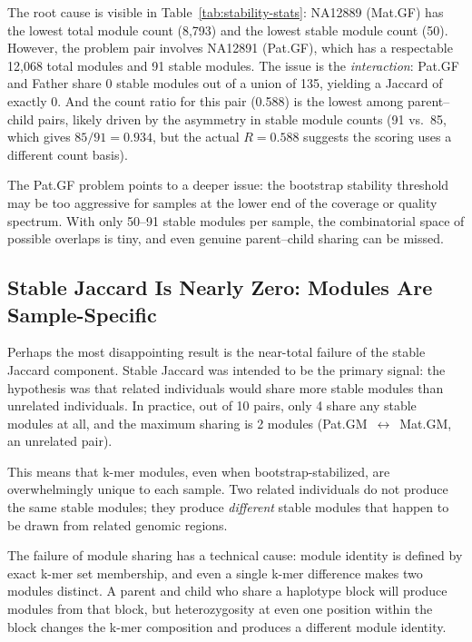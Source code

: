 \documentclass{../yalumba}
\begin{document}

The root cause is visible in Table~\ref{tab:stability-stats}: NA12889 (Mat.GF)
has the lowest total module count (8{,}793) and the lowest stable module count
(50).  However, the problem pair involves NA12891 (Pat.GF), which has a
respectable 12{,}068 total modules and 91 stable modules.  The issue is the
\emph{interaction}: Pat.GF and Father share 0 stable modules out of a union of
135, yielding a Jaccard of exactly 0.  And the count ratio for this pair
(0.588) is the lowest among parent--child pairs, likely driven by the
asymmetry in stable module counts (91 vs.\ 85, which gives $85/91 = 0.934$,
but the actual $R = 0.588$ suggests the scoring uses a different count basis).

The Pat.GF problem points to a deeper issue: the bootstrap stability threshold
may be too aggressive for samples at the lower end of the coverage or quality
spectrum.  With only 50--91 stable modules per sample, the combinatorial space
of possible overlaps is tiny, and even genuine parent--child sharing can be
missed.

\subsection{Stable Jaccard Is Nearly Zero: Modules Are Sample-Specific}

Perhaps the most disappointing result is the near-total failure of the stable
Jaccard component.  Stable Jaccard was intended to be the primary signal: the
hypothesis was that related individuals would share more stable modules than
unrelated individuals.  In practice, out of 10 pairs, only 4 share any stable
modules at all, and the maximum sharing is 2 modules (Pat.GM~$\leftrightarrow$~Mat.GM,
an unrelated pair).

This means that k-mer modules, even when bootstrap-stabilized, are
overwhelmingly unique to each sample.  Two related individuals do not produce
the same stable modules; they produce \emph{different} stable modules that
happen to be drawn from related genomic regions.


The failure of module sharing has a technical cause: module identity is defined
by exact k-mer set membership, and even a single k-mer difference makes two
modules distinct.  A parent and child who share a haplotype block will produce
modules from that block, but heterozygosity at even one position within the
block changes the k-mer composition and produces a different module identity.
\end{document}
